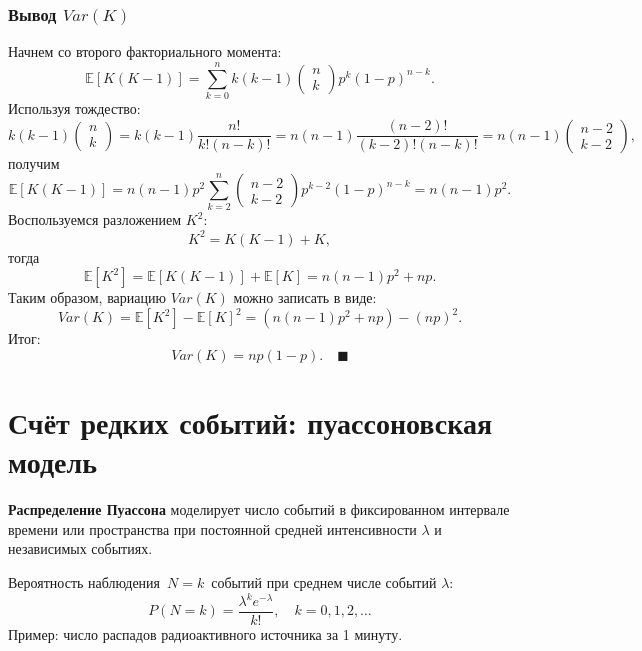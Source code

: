 \documentclass[
  russian,
  12pt,
  a4paper,
  a4paper,
  openany]{scrbook}
\begin{document}
\begin{bookderivation}

\subsubsection{\texorpdfstring{\textbf{Вывод}
\(Var(K)\)}{Вывод Var(K)}}\label{ux432ux44bux432ux43eux434-vark}

Начнем со второго факториального момента:
\[\mathbb{E}[K(K-1)]=\sum_{k=0}^n k(k-1) \begin{pmatrix} n\\k\end{pmatrix} p^k(1-p)^{n-k}.\]
Используя тождество:
\[k(k-1) \begin{pmatrix} n\\k\end{pmatrix}=k(k-1)\frac{n!}{k!(n-k)!}=n(n-1)\frac{(n-2)!}{(k-2)!(n-k)!}=n(n-1)\begin{pmatrix} n-2\\k-2\end{pmatrix},\]
получим
\[\mathbb{E}[K(K-1)]=n(n-1)p^2\sum_{k=2}^n \begin{pmatrix} n-2\\k-2\end{pmatrix} p^{k-2}(1-p)^{n-k}=n(n-1)p^2.\]
Воспользуемся разложением \(K^2\): \[K^2=K(K-1)+K,\] тогда
\[\mathbb{E}[K^2]=\mathbb{E}[K(K-1)]+\mathbb{E}[K]=n(n-1)p^2+np.\] Таким
образом, вариацию \(Var(K)\) можно записать в виде:
\[Var(K)=\mathbb{E}[K^2]-\mathbb{E}[K]^2=\left(n(n-1)p^2+np\right)-(np)^2.\]
Итог: \[Var(K)=np(1-p). \quad \blacksquare\]

\end{bookderivation}

\section{Счёт редких событий: пуассоновская
модель}\label{ux441ux447ux451ux442-ux440ux435ux434ux43aux438ux445-ux441ux43eux431ux44bux442ux438ux439-ux43fux443ux430ux441ux441ux43eux43dux43eux432ux441ux43aux430ux44f-ux43cux43eux434ux435ux43bux44c}

\begin{booknote}

\textbf{Распределение Пуассона} моделирует число событий в фиксированном
интервале времени или пространства при постоянной средней интенсивности
\(λ\) и независимых событиях.

Вероятность наблюдения~\(N=k\)~событий при среднем числе событий \(λ\):
\[P(N=k)=\frac{\lambda^k e^{-\lambda}}{k!}, \quad k=0,1,2,\dots\]
Пример: число распадов радиоактивного источника за 1 минуту.

\end{booknote}
\end{document}
